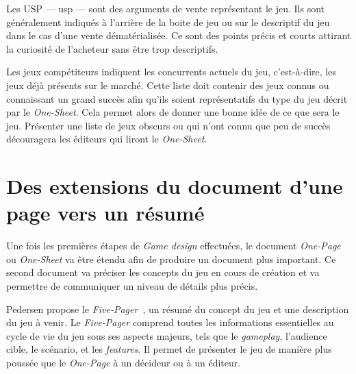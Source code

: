 
Les USP --- \gls{usp} --- sont des arguments de vente représentant le jeu.
Ils sont g\'en\'eralement indiqu\'es à l'arrière de la boite de jeu ou sur le descriptif du jeu dans le cas d'une vente dématérialisée.
Ce sont des points précis et courts attirant la curiosité de l'acheteur sans être trop descriptifs. 



Les jeux compétiteurs indiquent les concurrents actuels du jeu, c'est-\`a-dire, les jeux déjà présents sur le marché.
Cette liste doit contenir des jeux connus ou connaissant un grand succès afin qu'ils soient représentatifs du type du jeu d\'ecrit par le \emph{One-Sheet}.
Cela permet alors de donner une bonne idée de ce que sera le jeu.
Présenter une liste de jeux obscurs ou qui n'ont connu que peu de succès découragera les éditeurs qui liront le \emph{One-Sheet}.




\section{Des extensions du document d'une page vers un résumé}
Une fois les premières étapes de \emph{Game design} effectuées, le document \emph{One-Page} ou \emph{One-Sheet} va être étendu afin de produire un document plus important.
Ce second document va préciser les concepts du jeu en cours de création et va permettre de communiquer un niveau de détails plus précis.

Pedersen propose le \emph{Five-Pager}~\cite{GD_foundations_pedersen}, un résumé du concept du jeu et une description du jeu à venir.
Le \emph{Five-Pager} comprend toutes les informations essentielles au cycle de vie du jeu sous ses aspects majeurs, tels que le \emph{gameplay}, l'audience cible, le scénario, et les \emph{features}.
Il permet de présenter le jeu de manière plus poussée que le \emph{One-Page} à un décideur ou à un éditeur.



